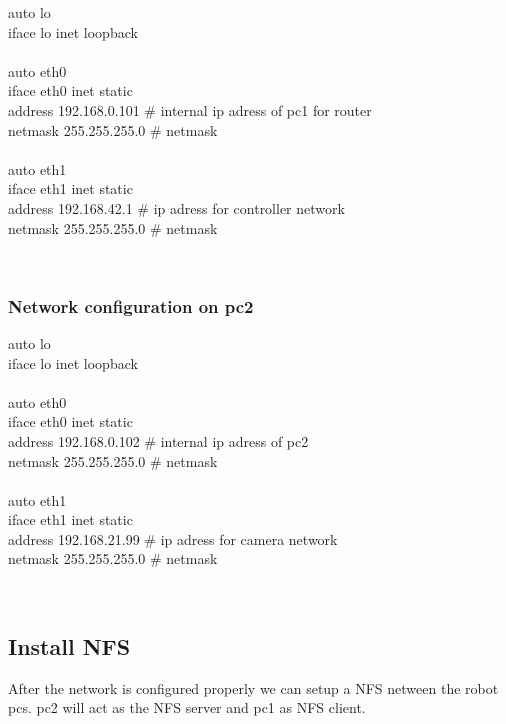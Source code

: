 \colorbox{light-gray} {
\begin{minipage}{1.0\textwidth} 
	auto lo \\
	iface lo inet loopback \\
	\\	
	auto eth0 \\
	iface eth0 inet static \\
	address 192.168.0.101 \# internal ip adress of pc1 for router\\
	netmask 255.255.255.0 \# netmask\\
	\\
	auto eth1 \\
	iface eth1 inet static \\
	address 192.168.42.1 \# ip adress for controller network\\
	netmask 255.255.255.0 \# netmask
\end{minipage} } \\

\subsubsection{Network configuration on pc2}

\colorbox{light-gray} {
\begin{minipage}{1.0\textwidth} 
	auto lo \\
	iface lo inet loopback \\
	\\	
	auto eth0 \\
	iface eth0 inet static \\
	address 192.168.0.102 \# internal ip adress of pc2\\
	netmask 255.255.255.0 \# netmask\\
	\\
	auto eth1 \\
	iface eth1 inet static \\
	address 192.168.21.99 \# ip adress for camera network\\
	netmask 255.255.255.0 \# netmask\\
\end{minipage} } \\

\subsection{Install NFS}
After the network is configured properly we can setup a NFS netween the robot pcs. pc2 will act as the NFS server and pc1 as NFS client.

